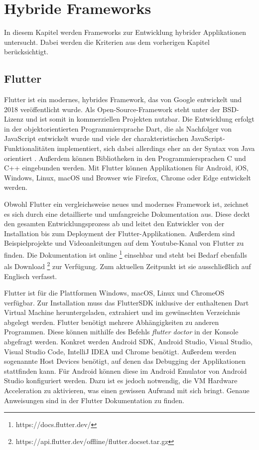\documentclass[]{lni}
\begin{document}
\clearpage

\section{Hybride Frameworks} \label{sec:frameworks}
In diesem Kapitel werden Frameworks zur Entwicklung hybrider Applikationen untersucht. Dabei werden die Kriterien aus dem vorherigen Kapitel berücksichtigt.

\subsection{Flutter}
Flutter ist ein modernes, hybrides Framework, das von Google entwickelt und 2018 veröffentlicht wurde. Als Open-Source-Framework steht unter der BSD-Lizenz und ist somit in kommerziellen Projekten nutzbar. Die Entwicklung erfolgt in der objektorientierten Programmiersprache Dart, die als Nachfolger von JavaScript entwickelt wurde und viele der charakteristischen JavaScript-Funktionalitäten implementiert, sich dabei allerdings eher an der Syntax von Java orientiert \cite{Wu.2018}. Außerdem können Bibliotheken in den Programmiersprachen C und C++ eingebunden werden. Mit Flutter können Applikationen für Android, iOS, Windows, Linux, macOS und Browser wie Firefox, Chrome oder Edge entwickelt werden.

Obwohl Flutter ein vergleichsweise neues und modernes Framework ist, zeichnet es sich durch eine detaillierte und umfangreiche Dokumentation aus. Diese deckt den gesamten Entwicklungsprozess ab und leitet den Entwickler von der Installation bis zum Deployment der Flutter-Applikationen. Außerdem sind Beispielprojekte und Videoanleitungen auf dem Youtube-Kanal von Flutter zu finden. Die Dokumentation ist online \footnote{https://docs.flutter.dev/} einsehbar und steht bei Bedarf ebenfalls als Download \footnote{https://api.flutter.dev/offline/flutter.docset.tar.gz} zur Verfügung. Zum aktuellen Zeitpunkt ist sie ausschließlich auf Englisch verfasst. 

Flutter ist für die Plattformen Windows, macOS, Linux und ChromeOS verfügbar. Zur Installation muss das FlutterSDK inklusive der enthaltenen Dart Virtual Machine heruntergeladen, extrahiert und im gewünschten Verzeichnis abgelegt werden. Flutter benötigt mehrere Abhängigkeiten zu anderen Programmen. Diese können mithilfe des Befehls \emph{flutter doctor} in der Konsole abgefragt werden. Konkret werden Android SDK, Android Studio, Visual Studio, Visual Studio Code, IntelliJ IDEA und Chrome benötigt. Außerdem werden sogenannte Host Devices benötigt, auf denen das Debugging der Applikationen stattfinden kann. Für Android können diese im Android Emulator von Android Studio konfiguriert werden. Dazu ist es jedoch notwendig, die VM Hardware Acceleration zu aktivieren, was einen gewissen Aufwand mit sich bringt. Genaue Anweisungen sind in der Flutter Dokumentation zu finden.
\end{document}
